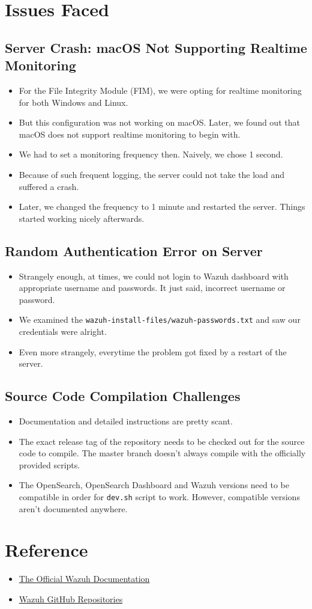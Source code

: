 \newpage
\section{Issues Faced}
\subsection{Server Crash: macOS Not Supporting Realtime Monitoring}
\begin{itemize}
    \item For the File Integrity Module (FIM), we were opting for realtime monitoring for both Windows and Linux.
    \item But this configuration was not working on macOS. Later, we found out that macOS does not support realtime monitoring to begin with.
    \item We had to set a monitoring frequency then. Naively, we chose 1 second.
    \item Because of such frequent logging, the server could not take the load and suffered a crash.
    \item Later, we changed the frequency to 1 minute and restarted the server. Things started working nicely afterwards.
\end{itemize} 

\subsection{Random Authentication Error on Server}
\begin{itemize}
    \item Strangely enough, at times, we could not login to Wazuh dashboard with appropriate username and passwords. It just said, incorrect username or password.
    \item We examined the \texttt{wazuh-install-files/wazuh-passwords.txt} and saw our credentials were alright.
    \item Even more strangely, everytime the problem got fixed by a restart of the server.
\end{itemize}

\subsection{Source Code Compilation Challenges}
\begin{itemize}
    \item Documentation and detailed instructions are pretty scant. 
    \item The exact release tag of the repository needs to be checked out for the source code to compile. The master branch doesn't always compile with the officially provided scripts.
    \item The OpenSearch, OpenSearch Dashboard and Wazuh versions need to be compatible in order for \texttt{dev.sh} script to work. However, compatible versions aren't documented anywhere.
\end{itemize}
\section{Reference}
\begin{itemize}
    \item \href{https://documentation.wazuh.com}{The Official Wazuh Documentation}
    \item \href{https://github.com/wazuh}{Wazuh GitHub Repositories}
\end{itemize}